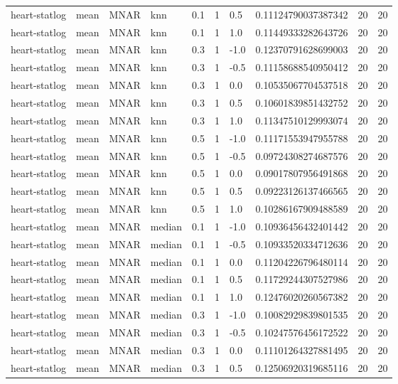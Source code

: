 \begin{tabular}{llllllllll}
heart-statlog & mean & MNAR & knn & 0.1 & 1 & 0.5 & 0.11124790037387342 & 20 & 20 \\
heart-statlog & mean & MNAR & knn & 0.1 & 1 & 1.0 & 0.11449333282643726 & 20 & 20 \\
heart-statlog & mean & MNAR & knn & 0.3 & 1 & -1.0 & 0.12370791628699003 & 20 & 20 \\
heart-statlog & mean & MNAR & knn & 0.3 & 1 & -0.5 & 0.11158688540950412 & 20 & 20 \\
heart-statlog & mean & MNAR & knn & 0.3 & 1 & 0.0 & 0.10535067704537518 & 20 & 20 \\
heart-statlog & mean & MNAR & knn & 0.3 & 1 & 0.5 & 0.10601839851432752 & 20 & 20 \\
heart-statlog & mean & MNAR & knn & 0.3 & 1 & 1.0 & 0.11347510129993074 & 20 & 20 \\
heart-statlog & mean & MNAR & knn & 0.5 & 1 & -1.0 & 0.11171553947955788 & 20 & 20 \\
heart-statlog & mean & MNAR & knn & 0.5 & 1 & -0.5 & 0.09724308274687576 & 20 & 20 \\
heart-statlog & mean & MNAR & knn & 0.5 & 1 & 0.0 & 0.09017807956491868 & 20 & 20 \\
heart-statlog & mean & MNAR & knn & 0.5 & 1 & 0.5 & 0.09223126137466565 & 20 & 20 \\
heart-statlog & mean & MNAR & knn & 0.5 & 1 & 1.0 & 0.10286167909488589 & 20 & 20 \\
heart-statlog & mean & MNAR & median & 0.1 & 1 & -1.0 & 0.10936456432401442 & 20 & 20 \\
heart-statlog & mean & MNAR & median & 0.1 & 1 & -0.5 & 0.10933520334712636 & 20 & 20 \\
heart-statlog & mean & MNAR & median & 0.1 & 1 & 0.0 & 0.11204226796480114 & 20 & 20 \\
heart-statlog & mean & MNAR & median & 0.1 & 1 & 0.5 & 0.11729244307527986 & 20 & 20 \\
heart-statlog & mean & MNAR & median & 0.1 & 1 & 1.0 & 0.12476020260567382 & 20 & 20 \\
heart-statlog & mean & MNAR & median & 0.3 & 1 & -1.0 & 0.10082929839801535 & 20 & 20 \\
heart-statlog & mean & MNAR & median & 0.3 & 1 & -0.5 & 0.10247576456172522 & 20 & 20 \\
heart-statlog & mean & MNAR & median & 0.3 & 1 & 0.0 & 0.11101264327881495 & 20 & 20 \\
heart-statlog & mean & MNAR & median & 0.3 & 1 & 0.5 & 0.12506920319685116 & 20 & 20 \\

\end{tabular}
